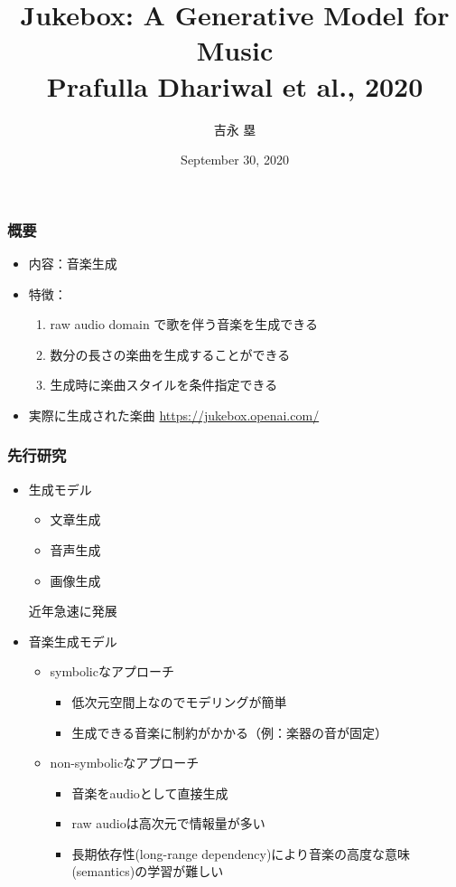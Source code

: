 \documentclass[dvipdfmx]{beamer}
\title[Jukebox \ (Dhariwal+, 2020)]{
    Jukebox: A Generative Model for Music \\
    {\large Prafulla Dhariwal et al., 2020}
}
\author{吉永 塁}
\date{September 30, 2020}
\begin{document}
\begin{frame}
    \titlepage
\end{frame}


\begin{frame}
    \frametitle{概要}
    \begin{itemize}
        \item 内容：音楽生成
        \item 特徴：
            \begin{enumerate}
                \item raw audio domain で歌を伴う音楽を生成できる
                \item 数分の長さの楽曲を生成することができる
                \item 生成時に楽曲スタイルを条件指定できる
            \end{enumerate}
        \vspace{\baselineskip}
        \item 実際に生成された楽曲 {\footnotesize \url{https://jukebox.openai.com/}}
    \end{itemize}
\end{frame}


\begin{frame}
    \frametitle{先行研究}
    \begin{itemize}
        \item 生成モデル
        \begin{itemize}
            \item 文章生成
            \item 音声生成
            \item 画像生成
        \end{itemize}
        近年急速に発展
        \vspace{\baselineskip}
        \item 音楽生成モデル
        \begin{itemize}
            \item symbolicなアプローチ
            \begin{itemize}
                \item 低次元空間上なのでモデリングが簡単
                \item 生成できる音楽に制約がかかる（例：楽器の音が固定）
            \end{itemize}
            \item non-symbolicなアプローチ
            \begin{itemize}
                \item 音楽をaudioとして直接生成
                \item raw audioは高次元で情報量が多い
                \item 長期依存性(long-range dependency)により音楽の高度な意味(semantics)の学習が難しい
            \end{itemize}
        \end{itemize}
    \end{itemize}
\end{frame}
\end{document}
